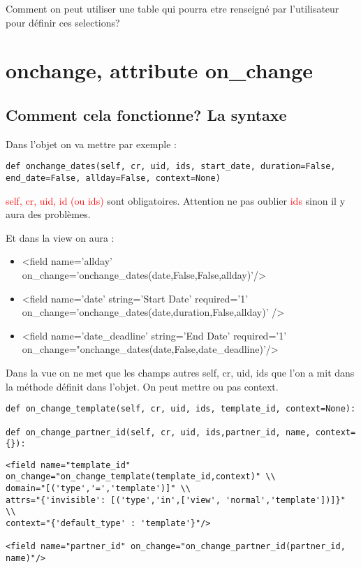 \documentclass[12pt,a4paper]{article}
\begin{document}
Comment on peut utiliser une table qui pourra etre renseigné par l'utilisateur pour définir ces selections?


\section{ onchange, attribute on\_change}
\label{sec:onchange}

\subsection{Comment cela fonctionne? La syntaxe}
\label{sec:syntax_onchange}

Dans l’objet on va mettre par exemple :

\begin{verbatim}
def onchange_dates(self, cr, uid, ids, start_date, duration=False, end_date=False, allday=False, context=None)
\end{verbatim}

 \textcolor{red}{self, cr, uid, id (ou ids)} sont obligatoires. Attention ne pas oublier  \textcolor{red}{ids} sinon il y aura des problèmes.

Et dans la view on aura :

\begin{itemize}
\item  <field name='allday' on\_change='onchange\_dates(date,False,False,allday)'/>
\item  <field name='date' string='Start Date' required='1' on\_change='onchange\_dates(date,duration,False,allday)' />
\item  <field name='date\_deadline' string='End Date' required='1' on\_change="onchange\_dates(date,False,date\_deadline)'/>
\end{itemize}

Dans la vue on ne met que les champs autres self, cr, uid, ids que l'on a mit dans la méthode définit dans l'objet. On peut mettre ou pas context.

\begin{verbatim}
def on_change_template(self, cr, uid, ids, template_id, context=None):

def on_change_partner_id(self, cr, uid, ids,partner_id, name, context={}):  
\end{verbatim}

\begin{verbatim}
<field name="template_id" on_change="on_change_template(template_id,context)" \\
domain="[('type','=','template')]" \\
attrs="{'invisible': [('type','in',['view', 'normal','template'])]}" \\
context="{'default_type' : 'template'}"/> 

<field name="partner_id" on_change="on_change_partner_id(partner_id, name)"/> 
\end{verbatim}
\end{document}
